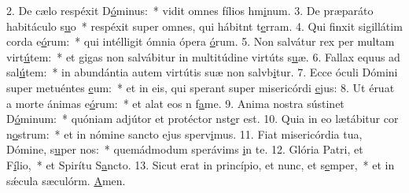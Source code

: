 2. De cælo respéxit D\uline{ó}minus:~* vidit omnes fílios hm\uline{i}num.
3. De præparáto habitáculo s\uline{u}o~* respéxit super omnes, qui hábitnt t\uline{e}rram.
4. Qui finxit sigillátim corda e\uline{ó}rum:~* qui intélligit ómnia ópera \uline{ó}rum.
5. Non salvátur rex per multam virt\uline{ú}tem:~* et gigas non salvábitur in multitúdine virtúts s\uline{u}æ.
6. Fallax equus ad sal\uline{ú}tem:~* in abundántia autem virtútis suæ non salvb\uline{i}tur.
7. Ecce óculi Dómini super metuéntes \uline{e}um:~* et in eis, qui sperant super misericórdi \uline{e}jus:
8. Ut éruat a morte ánimas e\uline{ó}rum:~* et alat eos n f\uline{a}me.
9. Anima nostra sústinet D\uline{ó}minum:~* quóniam adjútor et protéctor nst\uline{e}r est.
10. Quia in eo lætábitur cor n\uline{o}strum:~* et in nómine sancto ejus sperv\uline{i}mus.
11. Fiat misericórdia tua, Dómine, s\uline{u}per nos:~* quemádmodum sperávims \uline{i}n te.
12. Glória Patri, et F\uline{í}lio,~* et Spirítu S\uline{a}ncto.
13. Sicut erat in princípio, et nunc, et s\uline{e}mper,~* et in sǽcula sæculórm. \uline{A}men.
